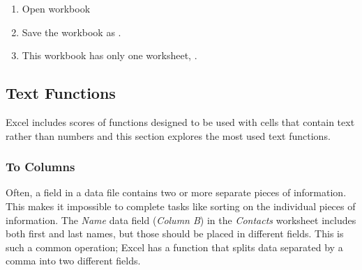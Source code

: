 \begin{enumerate}
	\item Open workbook 
	\item Save the workbook as .
	\item This workbook has only one worksheet, .
\end{enumerate}

\subsection{Text Functions}

Excel includes scores of functions designed to be used with cells that contain text rather than numbers and this section explores the most used text functions.

\subsubsection{To Columns}

Often, a field in a data file contains two or more separate pieces of information. This makes it impossible to complete tasks like sorting on the individual pieces of information. The \textit{Name} data field (\textit{Column B}) in the \textit{Contacts} worksheet includes both first and last names, but those should be placed in different fields. This is such a common operation; Excel has a function that splits data separated by a comma into two different fields.

